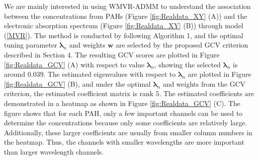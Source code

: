 \documentclass[alpha-refs]{wiley-article}
\begin{document}
We are mainly interested in using WMVR-ADMM to understand the association between the concentrations from PAHs (Figure 
\ref{fig:Realdata_XY} (A)) and the electronic absorption spectrum  (Figure \ref{fig:Realdata_XY} (B)) through model (\ref{MVR}). The method is conducted by following Algorithm 1, and the optimal tuning parameter $\boldsymbol{\lambda}_{n}$ and weights $\boldsymbol{w}$ are selected by the proposed GCV criterion described in Section 4. 
The resulting GCV scores are plotted in Figure \ref{fig:Realdata_GCV} (A) with respect to value $\boldsymbol{\lambda}_{n}$, showing the selected $\boldsymbol{\lambda}_{n}$ is around $0.039$. 
The estimated eigenvalues with respect to $\boldsymbol{\lambda}_{n}$ are plotted in Figure \ref{fig:Realdata_GCV} (B), and under the optimal $\boldsymbol{\lambda}_{n}$ and weights from the GCV criterion, the estimated coefficient matrix is rank $5$. 
The estimated coefficients are demonstrated in a heatmap as shown in Figure \ref{fig:Realdata_GCV} (C). 
The figure shows that for each PAH, only a few important channels can be used to determine the concentrations because only some coefficients are relatively large. 
Additionally, these larger coefficients are usually from smaller column numbers in the heatmap. 
Thus, the channels with smaller wavelengths are more important than larger wavelength channels.
\end{document}
